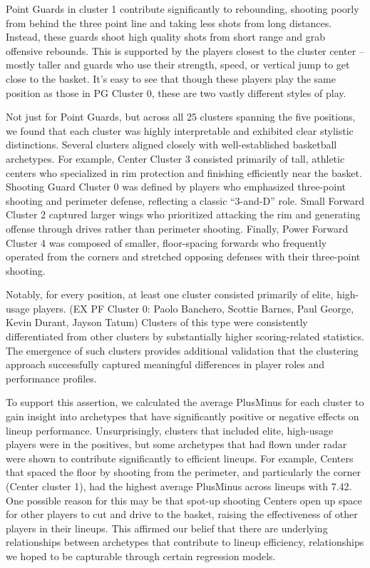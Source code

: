 \documentclass{article}
\begin{document}
Point Guards in cluster 1 contribute significantly to rebounding, shooting poorly from behind the 
three point line and taking less shots from long distances. Instead, these guards shoot high 
quality shots from short range and grab offensive rebounds. This is supported by the players 
closest to the cluster center – mostly taller and guards who use their strength, speed, or vertical 
jump to get close to the basket. It’s easy to see that though these players play the same 
position as those in PG Cluster 0, these are two vastly different styles of play.

Not just for Point Guards, but across all 25 clusters spanning the five positions, we found that each cluster was highly 
interpretable and exhibited clear stylistic distinctions. Several clusters aligned closely 
with well-established basketball archetypes. For example, Center Cluster 3 consisted primarily 
of tall, athletic centers who specialized in rim protection and finishing efficiently near the 
basket. Shooting Guard Cluster 0 was defined by players who emphasized three-point shooting and perimeter 
defense, reflecting a classic “3-and-D” role. Small Forward Cluster 2 captured larger 
wings who prioritized attacking the rim and generating offense through drives rather than perimeter 
shooting. Finally, Power Forward Cluster 4 was composed of smaller, floor-spacing forwards
 who frequently operated from the corners and stretched opposing defenses with their three-point 
 shooting.

Notably, for every position, at least one cluster consisted primarily of elite, high-usage 
players. (EX PF Cluster 0: Paolo Banchero, Scottie Barnes, Paul George, Kevin Durant, Jayson Tatum) 
Clusters of this type were consistently differentiated from other clusters by substantially 
higher scoring-related statistics. The emergence of such clusters provides additional 
validation that the clustering approach successfully captured meaningful differences in 
player roles and performance profiles.

To support this assertion, we calculated the average PlusMinus for each cluster to gain insight
 into archetypes that have significantly positive or negative effects on lineup performance. 
 Unsurprisingly, clusters that included elite, high-usage players were in the positives, but 
 some archetypes that had flown under radar were shown to contribute significantly to efficient 
 lineups. For example, Centers that spaced the floor by shooting from the perimeter, and 
 particularly the corner (Center cluster 1), had the highest average PlusMinus across lineups 
 with 7.42. One possible reason for this may be that spot-up shooting Centers open up space for 
 other players to cut and drive to the basket, raising the effectiveness of other players in 
 their lineups. This affirmed our belief that there are underlying relationships between 
 archetypes that contribute to lineup efficiency, relationships we hoped to be capturable 
 through certain regression models. 
\end{document}
